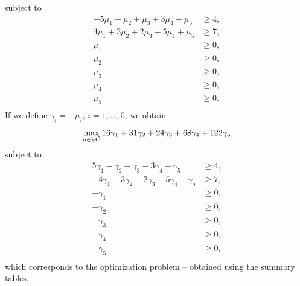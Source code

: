 subject to 
\begin{align*}
-5\mu_1+\mu_2+\mu_3+3\mu_4+\mu_5 &\geq 4, \\
4\mu_1+3\mu_2+2\mu_3+5\mu_4+\mu_5 &\geq 7, \\
\mu_1 &\geq 0, \\
\mu_2 &\geq 0, \\
\mu_3 &\geq 0, \\
\mu_4 &\geq 0, \\
\mu_5 &\geq 0. \\
\end{align*}
If we define $\gamma_i = -\mu_i$, $i=1,\ldots,5$, we obtain
\[
\max_{\mu \in \R^5} 16\gamma_1 +31\gamma_2 +24\gamma_3 +68\gamma_4+122\gamma_5
\]
subject to 
\begin{align*}
5\gamma_1-\gamma_2-\gamma_3-3\gamma_4-\gamma_5 &\geq 4, \\
-4\gamma_1-3\gamma_2-2\gamma_3-5\gamma_4-\gamma_5 &\geq 7, \\
-\gamma_1 &\geq 0, \\
-\gamma_2 &\geq 0, \\
-\gamma_3 &\geq 0, \\
-\gamma_4 &\geq 0, \\
-\gamma_5 &\geq 0, \\
\end{align*}
which corresponds to the optimization problem
-- obtained using the summary tables.

